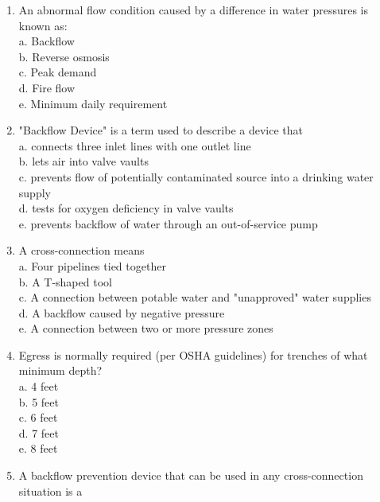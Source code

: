 \begin{enumerate}[1.]
  \item An abnormal flow condition caused by a difference in water pressures is known as:\\
a. Backflow\\

b. Reverse osmosis\\

c. Peak demand\\

d. Fire flow\\

e. Minimum daily requirement\\

\item "Backflow Device" is a term used to describe a device that\\
a. connects three inlet lines with one outlet line\\

b. lets air into valve vaults\\

c. prevents flow of potentially contaminated source into a drinking water supply\\

d. tests for oxygen deficiency in valve vaults\\

e. prevents backflow of water through an out-of-service pump\\

\item A cross-connection means\\
a. Four pipelines tied together\\
b. A T-shaped tool\\
c. A connection between potable water and "unapproved" water supplies\\
d. A backflow caused by negative pressure\\
e. A connection between two or more pressure zones \\

\item Egress is normally required (per OSHA guidelines) for trenches of what minimum depth?\\
a. 4 feet\\
b. 5 feet\\
c. 6 feet\\
d. 7 feet\\
e. 8 feet\\

\item A backflow prevention device that can be used in any cross-connection situation is a\\


\end{enumerate}
